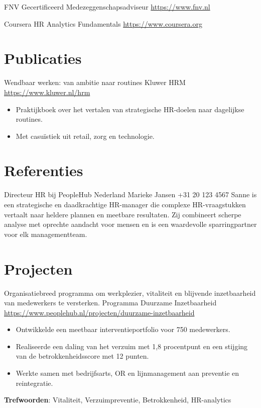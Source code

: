 \documentclass[a4paper, serif, 10pt]{moderncv}
\begin{document}
        {FNV}
        {Gecertificeerd Medezeggenschapsadviseur}
        {\url{https://www.fnv.nl}}
        {}
        {}

        {Coursera}
        {HR Analytics Fundamentals}
        {\url{https://www.coursera.org}}
        {}
        {}
\section{Publicaties}

        {Wendbaar werken: van ambitie naar routines}
        {Kluwer HRM}
        {\url{https://www.kluwer.nl/hrm}}
        {}
        {\begin{itemize}
\item Praktijkboek over het vertalen van strategische HR-doelen naar dagelijkse routines.
\item Met casuïstiek uit retail, zorg en technologie.
\end{itemize}}
\section{Referenties}

        {Directeur HR bij PeopleHub Nederland}
        {Marieke Jansen}
        {+31 20 123 4567}
        {}
        {Sanne is een strategische en daadkrachtige HR-manager die complexe HR-vraagstukken vertaalt naar heldere plannen en meetbare resultaten. Zij combineert scherpe analyse met oprechte aandacht voor mensen en is een waardevolle sparringpartner voor elk managementteam.}
\section{Projecten}

        {Organisatiebreed programma om werkplezier, vitaliteit en blijvende inzetbaarheid van medewerkers te versterken.}
        {Programma Duurzame Inzetbaarheid}
        {\url{https://www.peoplehub.nl/projecten/duurzame-inzetbaarheid}}
        {}
        {\begin{itemize}
\item Ontwikkelde een meetbaar interventieportfolio voor 750 medewerkers.
\item Realiseerde een daling van het verzuim met 1,8 procentpunt en een stijging van de betrokkenheidsscore met 12 punten.
\item Werkte samen met bedrijfsarts, OR en lijnmanagement aan preventie en reintegratie.
\end{itemize}
\textbf{Trefwoorden}: Vitaliteit, Verzuimpreventie, Betrokkenheid, HR-analytics}
\end{document}
